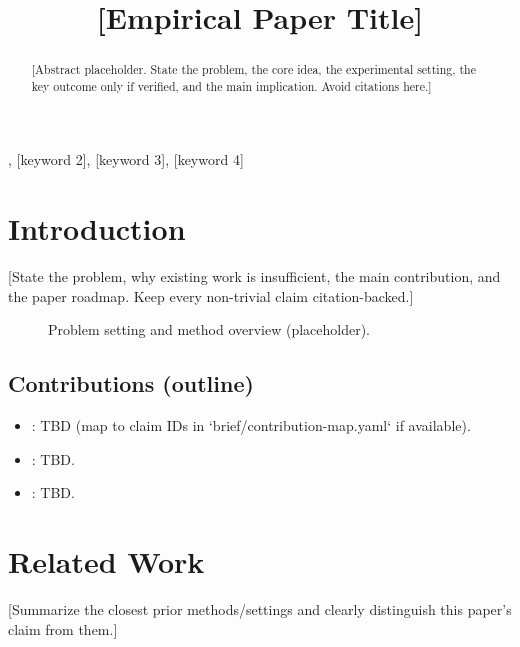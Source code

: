 \documentclass[conference]{IEEEtran}
\begin{document}
\title{[Empirical Paper Title]}

\author{%
}

\maketitle

\begin{IEEEkeywords}
[keyword 1], [keyword 2], [keyword 3], [keyword 4]
\end{IEEEkeywords}

\begin{abstract}
[Abstract placeholder. State the problem, the core idea, the experimental setting,
the key outcome only if verified, and the main implication. Avoid citations here.]
\end{abstract}

\section{Introduction}
[State the problem, why existing work is insufficient, the main contribution, and
the paper roadmap. Keep every non-trivial claim citation-backed.]

\begin{figure}[t]
\centering
{}
\caption{Problem setting and method overview (placeholder).}
\label{fig:teaser}
\end{figure}

\subsection{Contributions (outline)}
\begin{itemize}[leftmargin=*]
\item [Contribution 1]: TBD (map to claim IDs in `brief/contribution-map.yaml` if available).
\item [Contribution 2]: TBD.
\item [Contribution 3]: TBD.
\end{itemize}

\section{Related Work}
[Summarize the closest prior methods/settings and clearly distinguish this paper's
claim from them.]
\end{document}
